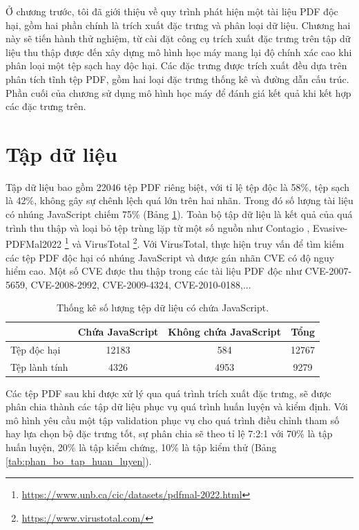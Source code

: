 \documentclass[./../main.tex]{subfiles}
\begin{document}
Ở chương trước, tôi đã giới thiệu về quy trình phát hiện một tài liệu PDF độc hại, gồm hai phần chính là trích xuất đặc trưng và phân loại dữ liệu. Chương hai này sẽ tiến hành thử nghiệm, từ cài đặt công cụ trích xuất đặc trưng trên tập dữ liệu thu thập được đến xây dựng mô hình học máy mang lại độ chính xác cao khi phân loại một tệp sạch hay độc hại. Các đặc trưng được trích xuất đều dựa trên phân tích tĩnh tệp PDF, gồm hai loại đặc trưng thống kê và đường dẫn cấu trúc. Phần cuối của chương sử dụng mô hình học máy để đánh giá kết quả khi kết hợp các đặc trưng trên.

\section{Tập dữ liệu}


Tập dữ liệu bao gồm 22046 tệp PDF riêng biệt, với tỉ lệ tệp độc là 58\%, tệp sạch là 42\%, không gây sự chênh lệch quá lớn trên hai nhãn. Trong đó số lượng tài liệu có nhúng JavaScript chiếm 75\% (Bảng \ref{tab:data_contain_JavaScript}). Toàn bộ tập dữ liệu là kết quả của quá trình thu thập và loại bỏ tệp trùng lặp từ một số nguồn như Contagio \cite{contagio}, Evasive-PDFMal2022 \footnote{\url{https://www.unb.ca/cic/datasets/pdfmal-2022.html}} và VirusTotal \footnote{\url{https://www.virustotal.com/}}. Với VirusTotal, thực hiện truy vấn để tìm kiếm các tệp PDF độc hại có nhúng JavaScript và được gán nhãn CVE có độ nguy hiểm cao. Một số CVE được thu thập trong các tài liệu PDF độc như CVE-2007-5659, CVE-2008-2992, CVE-2009-4324, CVE-2010-0188,...


\begin{table}[]
	\centering
	\caption{Thống kê số lượng tệp dữ liệu có chứa JavaScript.}
	\label{tab:data_contain_JavaScript}
	\begin{tabular}{|l|c|c|c|}
		\hline
		              & Chứa JavaScript & Không chứa JavaScript & Tổng  \\ \hline
		Tệp độc hại   & 12183           & 584                   & 12767 \\ \hline
		Tệp lành tính & 4326            & 4953                  & 9279  \\ \hline
	\end{tabular}
\end{table}


Các tệp PDF sau khi được xử lý qua quá trình trích xuất đặc trưng, sẽ được phân chia thành các tập dữ liệu phục vụ quá trình huấn luyện và kiểm định. Với mô hình yêu cầu một tập validation phục vụ cho quá trình điều chỉnh tham số hay lựa chọn bộ đặc trưng tốt, sự phân chia sẽ theo tỉ lệ 7:2:1 với 70\% là tập huấn luyện, 20\% là tập kiểm chứng, 10\% là tập kiểm thử (Bảng \ref{tab:phan_bo_tap_huan_luyen}).
\end{document}
